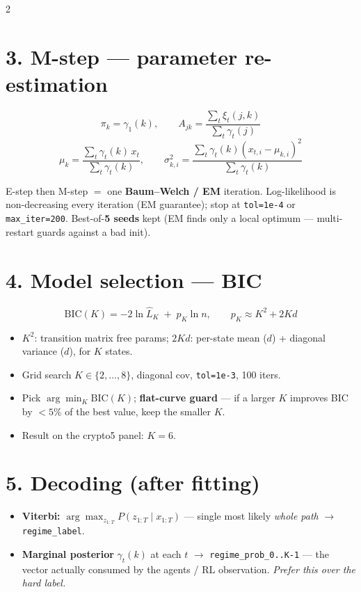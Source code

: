 \documentclass[9pt]{extarticle}
\begin{document}
\begin{multicols}{2}
\section{3. M-step --- parameter re-estimation}
$$\pi_k=\gamma_1(k),\qquad
A_{jk}=\frac{\sum_t \xi_t(j,k)}{\sum_t \gamma_t(j)}$$
$$\mu_k=\frac{\sum_t \gamma_t(k)\,x_t}{\sum_t \gamma_t(k)},\qquad
\sigma_{k,i}^2=\frac{\sum_t \gamma_t(k)(x_{t,i}-\mu_{k,i})^2}{\sum_t \gamma_t(k)}$$

E-step then M-step $=$ one \textbf{Baum--Welch / EM} iteration. Log-likelihood
is non-decreasing every iteration (EM guarantee); stop at \texttt{tol=1e-4} or
\texttt{max\_iter=200}. Best-of-\textbf{5 seeds} kept (EM finds only a local
optimum --- multi-restart guards against a bad init).

\columnbreak

\section{4. Model selection --- BIC}
$$\text{BIC}(K) = -2\ln \hat L_K \;+\; p_K \ln n,\qquad
p_K \approx K^2 + 2Kd$$
\begin{itemize}
\item $K^2$: transition matrix free params; $2Kd$: per-state mean ($d$) + diagonal variance ($d$), for $K$ states.
\item Grid search $K \in \{2,\dots,8\}$, diagonal cov, \texttt{tol=1e-3}, 100 iters.
\item Pick $\arg\min_K \text{BIC}(K)$; \textbf{flat-curve guard} --- if a larger
$K$ improves BIC by $<5\%$ of the best value, keep the smaller $K$.
\item Result on the crypto5 panel: $K=6$.
\end{itemize}

\section{5. Decoding (after fitting)}
\begin{itemize}
\item \textbf{Viterbi:} $\displaystyle\arg\max_{z_{1:T}} P(z_{1:T}\mid x_{1:T})$
--- single most likely \emph{whole path} $\to$ \texttt{regime\_label}.
\item \textbf{Marginal posterior} $\gamma_t(k)$ at each $t$ $\to$
\texttt{regime\_prob\_0..K-1} --- the vector actually consumed by the agents
/ RL observation. \emph{Prefer this over the hard label.}
\end{itemize}


\end{multicols}
\end{document}
